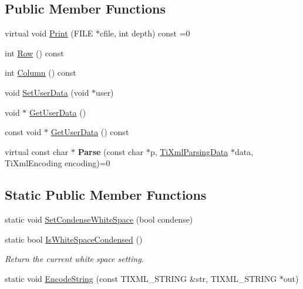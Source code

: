\subsection*{\-Public \-Member \-Functions}
\begin{DoxyCompactItemize}
\item 
virtual void \hyperlink{class_ti_xml_base_a0de56b3f2ef14c65091a3b916437b512}{\-Print} (\-F\-I\-L\-E $\ast$cfile, int depth) const =0
\item 
int \hyperlink{class_ti_xml_base_a024bceb070188df92c2a8d8852dd0853}{\-Row} () const 
\item 
int \hyperlink{class_ti_xml_base_ab54bfb9b70fe6dd276e7b279cab7f003}{\-Column} () const 
\item 
void \hyperlink{class_ti_xml_base_ac6b3e0f790930d4970ec30764e937b5d}{\-Set\-User\-Data} (void $\ast$user)
\item 
void $\ast$ \hyperlink{class_ti_xml_base_a6559a530ca6763fc301a14d77ed28c17}{\-Get\-User\-Data} ()
\item 
const void $\ast$ \hyperlink{class_ti_xml_base_ad0120210e4680ef2088601753ce0ede4}{\-Get\-User\-Data} () const 
\item 
\hypertarget{class_ti_xml_base_a00e4edb0219d00a1379c856e5a1d2025}{
virtual const char $\ast$ {\bfseries \-Parse} (const char $\ast$p, \hyperlink{class_ti_xml_parsing_data}{\-Ti\-Xml\-Parsing\-Data} $\ast$data, \-Ti\-Xml\-Encoding encoding)=0}
\label{class_ti_xml_base_a00e4edb0219d00a1379c856e5a1d2025}

\end{DoxyCompactItemize}
\subsection*{\-Static \-Public \-Member \-Functions}
\begin{DoxyCompactItemize}
\item 
static void \hyperlink{class_ti_xml_base_a0f799ec645bfb8d8a969e83478f379c1}{\-Set\-Condense\-White\-Space} (bool condense)
\item 
\hypertarget{class_ti_xml_base_ad4b1472531c647a25b1840a87ae42438}{
static bool \hyperlink{class_ti_xml_base_ad4b1472531c647a25b1840a87ae42438}{\-Is\-White\-Space\-Condensed} ()}
\label{class_ti_xml_base_ad4b1472531c647a25b1840a87ae42438}

\begin{DoxyCompactList}\small\item\em \-Return the current white space setting. \end{DoxyCompactList}\item 
static void \hyperlink{class_ti_xml_base_a32ed202562b58de64c7d799ca3c9db98}{\-Encode\-String} (const \-T\-I\-X\-M\-L\-\_\-\-S\-T\-R\-I\-N\-G \&str, \-T\-I\-X\-M\-L\-\_\-\-S\-T\-R\-I\-N\-G $\ast$out)
\end{DoxyCompactItemize}
